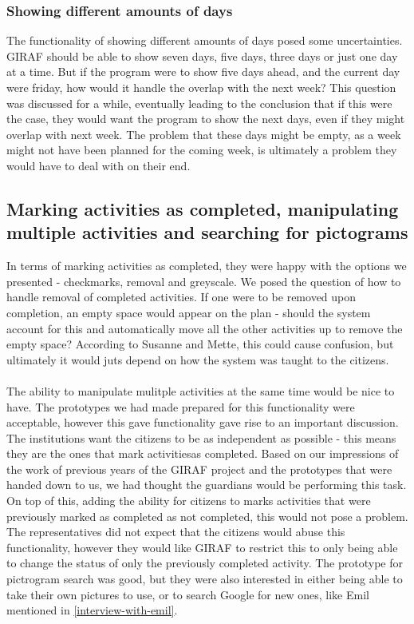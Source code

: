 \subsubsection{Showing different amounts of days}
The functionality of showing different amounts of days posed some uncertainties. 
GIRAF should be able to show seven days, five days, three days or just one day at a time.
But if the program were to show five days ahead, and the current day were friday, how would it handle the overlap with the next week?
This question was discussed for a while, eventually leading to the conclusion that if this were the case, they would want the program to show the next days, even if they might overlap with next week.
The problem that these days might be empty, as a week might not have been planned for the coming week, is ultimately a problem they would have to deal with on their end.

\subsection{Marking activities as completed, manipulating multiple activities and searching for pictograms}
In terms of marking activities as completed, they were happy with the options we presented - checkmarks, removal and greyscale. 
We posed the question of how to handle removal of completed activities.
If one were to be removed upon completion, an empty space would appear on the plan - should the system account for this and automatically move all the other activities up to remove the empty space?
According to Susanne and Mette, this could cause confusion, but ultimately it would juts depend on how the system was taught to the citizens.
\\\\
The ability to manipulate mulitple activities at the same time would be nice to have. 
The prototypes we had made prepared for this functionality were acceptable, however this gave functionality gave rise to an important discussion.
The institutions want the citizens to be as independent as possible - this means they are the ones that mark activitiesas completed.
Based on our impressions of the work of previous years of the GIRAF project and the prototypes that were handed down to us, we had thought the guardians would be performing this task.
On top of this, adding the ability for citizens to marks activities that were previously marked as completed as not completed, this would not pose a problem.
The representatives did not expect that the citizens would abuse this functionality, however they would like GIRAF to restrict this to only being able to change the status of only the previously completed activity.   
The prototype for pictrogram search was good, but they were also interested in either being able to take their own pictures to use, or to search Google for new ones, like Emil mentioned in \ref{interview-with-emil}.

